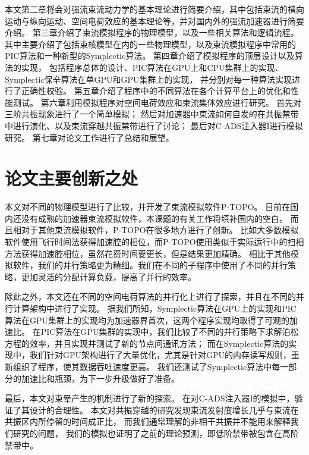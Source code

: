 本文第二章将会对强流束流动力学的基本理论进行简要介绍，其中包括束流的横向运动与纵向运动、空间电荷效应的基本理论等，并对国内外的强流加速器进行简要介绍。
第三章介绍了束流模拟程序的物理模型，以及一些相关算法和逻辑流程。其中主要介绍了包括束核模型在内的一些物理模型，以及束流模拟程序中常用的PIC算法和一种新型的Symplectic算法。
第四章介绍了模拟程序的顶层设计以及算法的实现，
包括程序总体的设计、PIC算法在GPU上和CPU集群上的实现、Symplectic保辛算法在单GPU和GPU集群上的实现，
并分别对每一种算法实现进行了正确性校验。
第五章介绍了程序中的不同算法在各个计算平台上的优化和性能测试。
第六章利用模拟程序对空间电荷效应和束流集体效应进行研究。
首先对三阶共振现象进行了一个简单模拟；
然后对加速器中束流如何自发的在共振禁带中进行演化、以及束流穿越共振禁带进行了讨论；
最后对C-ADS注入器I进行模拟研究。
第七章对论文工作进行了总结和展望。

\section{论文主要创新之处}
本文对不同的物理模型进行了比较，并开发了束流模拟软件P-TOPO。
目前在国内还没有成熟的加速器束流模拟软件，本课题的有关工作将填补国内的空白。
而且相对于其他束流模拟软件，P-TOPO在很多地方进行了创新。
比如大多数模拟软件使用飞行时间法获得加速腔的相位，而P-TOPO使用类似于实际运行中的扫相方法获得加速腔相位，虽然花费时间要更长，但是结果更加精确。
相比于其他模拟软件，我们的并行策略更为精细。我们在不同的子程序中使用了不同的并行策略，更加灵活的分配计算负载，提高了并行的效率。

除此之外，本文还在不同的空间电荷算法的并行化上进行了探索，并且在不同的并行计算架构中进行了实现。
据我们所知，Symplectic算法在GPU上的实现和PIC算法在GPU集群上的实现均为加速器界首次，这两个程序实现均取得了可观的加速比。
在PIC算法在GPU集群的实现中，我们比较了不同的并行策略下求解泊松方程的效率，并且实现并测试了新的节点间通讯方法；
而在Symplectic算法的实现中，我们针对GPU架构进行了大量优化，尤其是针对GPU的内存读写规则，重新组织了程序，使其数据吞吐速度更高。
我们还测试了Symplectic算法中每一部分的加速比和瓶颈，为下一步升级做好了准备。

最后，本文对束晕产生的机制进行了新的探索。
在对C-ADS注入器I的模拟中，验证了其设计的合理性。
本文对共振穿越的研究发现束流发射度增长几乎与束流在共振区内所停留的时间成正比，
而我们通常理解的非相干共振并不能用来解释我们研究的问题，
我们的模拟也证明了之前的理论预测，即低阶禁带被包含在高阶禁带中。
